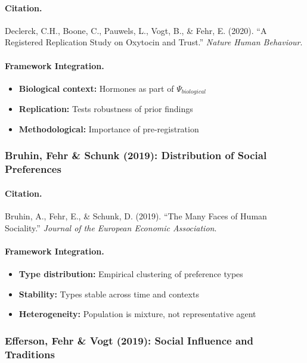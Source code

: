 \documentclass[12pt,a4paper]{article}
\begin{document}
\paragraph{Citation.}
Declerck, C.H., Boone, C., Pauwels, L., Vogt, B., \& Fehr, E. (2020).
``A Registered Replication Study on Oxytocin and Trust.''
\emph{Nature Human Behaviour}.

\paragraph{Framework Integration.}
\begin{itemize}
  \item \textbf{Biological context:} Hormones as part of $\Psi_{biological}$
  \item \textbf{Replication:} Tests robustness of prior findings
  \item \textbf{Methodological:} Importance of pre-registration
\end{itemize}

\subsubsection{Bruhin, Fehr \& Schunk (2019): Distribution of Social Preferences}

\paragraph{Citation.}
Bruhin, A., Fehr, E., \& Schunk, D. (2019).
``The Many Faces of Human Sociality.''
\emph{Journal of the European Economic Association}.

\paragraph{Framework Integration.}
\begin{itemize}
  \item \textbf{Type distribution:} Empirical clustering of preference types
  \item \textbf{Stability:} Types stable across time and contexts
  \item \textbf{Heterogeneity:} Population is mixture, not representative agent
\end{itemize}

\subsubsection{Efferson, Fehr \& Vogt (2019): Social Influence and Traditions}
\end{document}
